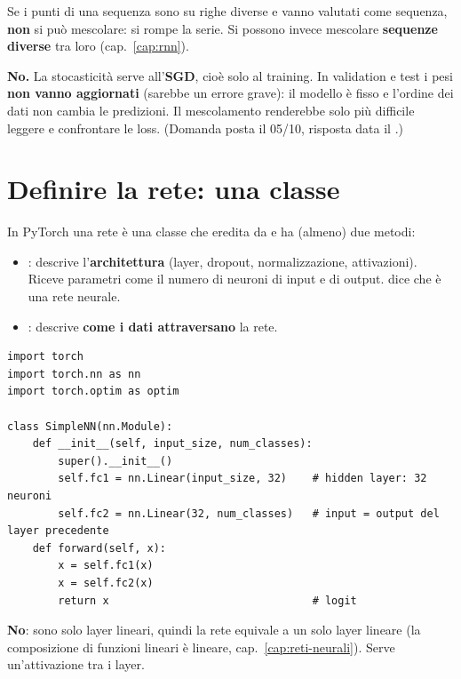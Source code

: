 \begin{attenzione}
Se i punti di una sequenza sono su righe diverse e vanno valutati come sequenza, \textbf{non} si può mescolare: si rompe la
serie. Si possono invece mescolare \textbf{sequenze diverse} tra loro (cap.~\ref{cap:rnn}).
\end{attenzione}
\begin{esame}
\textbf{No.} La stocasticità serve all'\textbf{SGD}, cioè solo al training. In validation e test i pesi \textbf{non vanno
aggiornati} (sarebbe un errore grave): il modello è fisso e l'ordine dei dati non cambia le predizioni. Il mescolamento
renderebbe solo più difficile leggere e confrontare le loss. (Domanda posta il 05/10, risposta data il .)
\end{esame}

\section{Definire la rete: una classe}
\label{sec:ffnn-classe}
In PyTorch una rete è una classe che eredita da  e ha (almeno) due metodi:
\begin{itemize}
  \item {}: descrive l'\textbf{architettura} (layer, dropout, normalizzazione, attivazioni). Riceve parametri come
        il numero di neuroni di input e di output.  dice che è una rete neurale.
  \item {}: descrive \textbf{come i dati attraversano} la rete.
\end{itemize}

\begin{lstlisting}
import torch
import torch.nn as nn
import torch.optim as optim

class SimpleNN(nn.Module):
    def __init__(self, input_size, num_classes):
        super().__init__()
        self.fc1 = nn.Linear(input_size, 32)    # hidden layer: 32 neuroni
        self.fc2 = nn.Linear(32, num_classes)   # input = output del layer precedente
    def forward(self, x):
        x = self.fc1(x)
        x = self.fc2(x)
        return x                                # logit
\end{lstlisting}
\begin{esame}
\textbf{No}: sono solo layer lineari, quindi la rete equivale a un solo layer lineare (la composizione di funzioni lineari
è lineare, cap.~\ref{cap:reti-neurali}). Serve un'attivazione tra i layer.
\end{esame}

